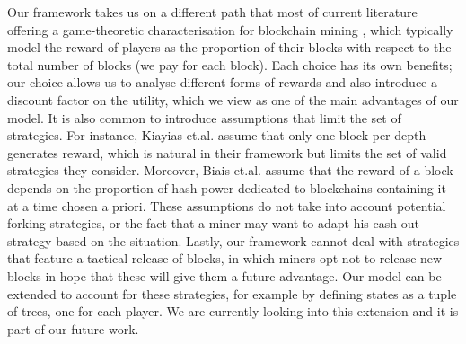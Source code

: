 

 Our framework takes us on a different path that most of current literature offering a game-theoretic characterisation for blockchain mining \cite{mininggames:2016,biais2018blockchain,koutsoupias2018blockchain}, which typically model the reward of players as the proportion of their blocks with respect to the total number of blocks (we pay for each block). Each choice has its own benefits; our choice allows us to analyse different forms of rewards and also introduce a discount factor on the utility, which we view as one of the main advantages of our model. It is also common to introduce assumptions that limit the set of strategies. For instance, Kiayias et.al. \cite{mininggames:2016} assume that only one block per depth generates reward, which is natural in their framework but limits the set of valid strategies they consider. Moreover, Biais et.al.\cite{biais2018blockchain}  assume that the reward of a block depends on the proportion of hash-power dedicated to blockchains containing it at a time chosen a priori. These assumptions do not take into account potential forking strategies, or the fact that a miner may want to adapt his cash-out strategy based on the situation. 
Lastly, our framework cannot deal with strategies that feature a tactical release of blocks, in which miners opt not to release new blocks in hope that these will give them a future advantage. Our model can be extended to account for these strategies, for example by defining states as a tuple of trees, one for each player. We are currently looking into this extension and it is part of our future work.
